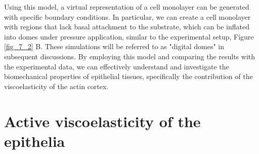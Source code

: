 Using this model, a virtual representation of a cell monolayer can be generated with specific boundary conditions. In particular, we can create a cell monolayer with regions that lack basal attachment to the substrate, which can be inflated into domes under pressure application, similar to the experimental setup, Figure \ref{fig_7_2} B. These simulations will be referred to as "digital domes" in subsequent discussions. By employing this model and comparing the results with the experimental data, we can effectively understand and investigate the biomechanical properties of epithelial tissues, specifically the contribution of the viscoelasticity of the actin cortex.


\hypertarget{active-viscoelasticity-of-the-epithelia}{%
	\section{Active viscoelasticity of the
		epithelia}\label{active-viscoelasticity-of-the-epithelia}}
	
